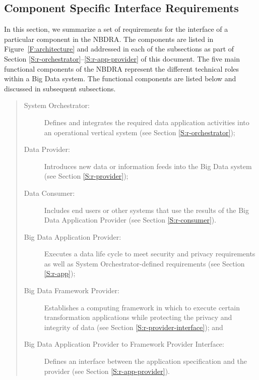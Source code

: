 \documentclass[10pt]{article}
\begin{document}
\subsection{Component Specific Interface Requirements}

In this section, we summarize a set of requirements for the interface
of a particular component in the NBDRA. The components are listed in
Figure~\ref{F:architecture} and addressed in each of the subsections
as part of Section \ref{S:r-orchestrator}--\ref{S:r-app-provider} of this
document. The five main functional components of the NBDRA represent
the different technical roles within a Big Data system. The functional
components are listed below and discussed in subsequent subsections.

\begin{quote}
\begin{description}

\item[System Orchestrator:] Defines and integrates the required data
  application activities into an operational vertical system (see
  Section \ref{S:r-orchestrator});

\item[Data Provider:] Introduces new data or information feeds into
  the Big Data system  (see
  Section \ref{S:r-provider});

\item[Data Consumer:] Includes end users or other systems that use the
  results of the Big Data Application Provider  (see
  Section \ref{S:r-consumer}).

\item[Big Data Application Provider:] Executes a data life cycle to
  meet security and privacy requirements as well as System
  Orchestrator-defined requirements  (see
  Section \ref{S:r-app});

\item [Big Data Framework Provider:] Establishes a computing framework
  in which to execute certain transformation applications while
  protecting the privacy and integrity of data  (see
  Section \ref{S:r-provider-interface}); and

\item[Big Data Application Provider to Framework Provider
  Interface:] Defines an interface between the application
  specification and the provider (see Section \ref{S:r-app-provider}).

\end{description}
\end{quote}
\end{document}
